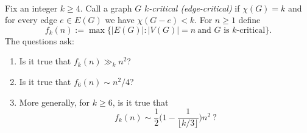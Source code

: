 \\
Fix an integer $k\ge 4$. Call a graph $G$ \emph{$k$-critical (edge-critical)} if $\chi(G)=k$ and for every edge $e\in E(G)$ we have $\chi(G-e)<k$. For $n\ge 1$ define
\[
 f_k(n):=\max\{|E(G)|: |V(G)|=n\ \text{and $G$ is $k$-critical}\}.
\]
The questions ask:
\begin{enumerate}
\item[(Q1)] Is it true that $f_k(n)\gg_k n^2$?
\item[(Q2)] Is it true that $f_6(n)\sim n^2/4$?
\item[(Q3)] More generally, for $k\ge 6$, is it true that
\[ f_k(n) \sim \frac12\Big(1-\frac{1}{\lfloor k/3\rfloor}\Big)n^2\ ?\]
\end{enumerate}
